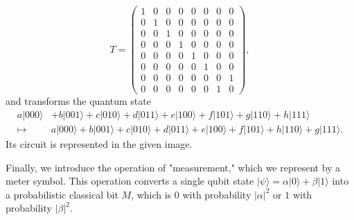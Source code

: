 \documentclass{article}
\theoremstyle{definition}
\begin{document}
\begin{itemize}
    \[T = \begin{pmatrix} 1&0&0&0&0&0&0&0\\ 0&1&0&0&0&0&0&0\\ 0&0&1&0&0&0&0&0\\ 0&0&0&1&0&0&0&0\\ 0&0&0&0&1&0&0&0\\ 0&0&0&0&0&1&0&0\\ 0&0&0&0&0&0&0&1\\ 0&0&0&0&0&0&1&0 \end{pmatrix},\]
    and transforms the quantum state
    \begin{align*}
      a|000\rangle & + b|001\rangle + c|010\rangle + d |011\rangle + e|100\rangle + f |101\rangle + g|110\rangle + h|111\rangle \\
      \mapsto & a|000\rangle + b|001\rangle + c|010\rangle + d |011\rangle + e|100\rangle + f |101\rangle + h|110\rangle + g|111\rangle.
    \end{align*}
    Its circuit is represented in the given image.
\end{itemize}

Finally, we introduce the operation of "measurement," which we represent by a meter symbol. This operation converts a single qubit state $| \psi \rangle = \alpha |0\rangle + \beta |1\rangle$ into a probabilistic classical bit $M$, which is $0$ with probability $|\alpha|^2$ or $1$ with probability $|\beta|^2$. 
\end{document}
